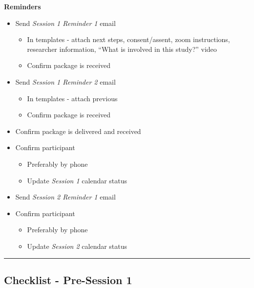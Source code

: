 \documentclass[]{book}
\providecommand{\tightlist}{%
  \setlength{\itemsep}{0pt}\setlength{\parskip}{0pt}}
\begin{document}
\textbf{Reminders}

\begin{itemize}
\tightlist
\item
  Send \emph{Session 1 Reminder 1} email

  \begin{itemize}
  \tightlist
  \item
    In templates - attach next steps, consent/assent, zoom instructions, researcher information, ``What is involved in this study?'' video
  \item
    Confirm package is received
  \end{itemize}
\item
  Send \emph{Session 1 Reminder 2} email

  \begin{itemize}
  \tightlist
  \item
    In templates - attach previous
  \item
    Confirm package is received
  \end{itemize}
\item
  Confirm package is delivered and received
\item
  Confirm participant

  \begin{itemize}
  \tightlist
  \item
    Preferably by phone
  \item
    Update \emph{Session 1} calendar status
  \end{itemize}
\item
  Send \emph{Session 2 Reminder 1} email
\item
  Confirm participant

  \begin{itemize}
  \tightlist
  \item
    Preferably by phone
  \item
    Update \emph{Session 2} calendar status
  \end{itemize}
\end{itemize}

\begin{center}\rule{0.5\linewidth}{0.5pt}\end{center}

\hypertarget{checklist---pre-session-1}{%
\subsection{Checklist - Pre-Session 1}\label{checklist---pre-session-1}}
\end{document}
